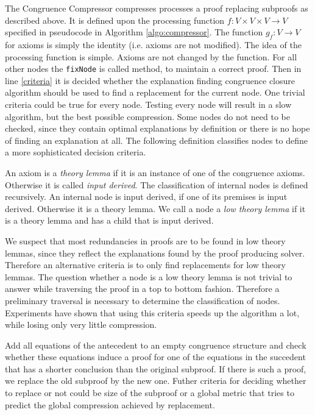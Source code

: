 The Congruence Compressor compresses processes a proof replacing subproofs as described above. 
It is defined upon the processing function $f: V \times V \times V \rightarrow V$ specified in pseudocode in Algorithm \ref{algo:compressor}.
The function $g_f: V \rightarrow V$ for axioms is simply the identity (i.e. axioms are not modified).
The idea of the processing function is simple.
Axioms are not changed by the function.
For all other nodes the \texttt{fixNode} is called method, to maintain a correct proof.
Then in line \ref{criteria} it is decided whether the explanation finding congruence closure algorithm should be used to find a replacement for the current node.
One trivial criteria could be true for every node.
Testing every node will result in a slow algorithm, but the best possible compression.
Some nodes do not need to be checked, since they contain optimal explanations by definition or there is no hope of finding an explanation at all.
The following definition classifies nodes to define a more sophisticated decision criteria.

\begin{definition}

An axiom is a \emph{theory lemma} if it is an instance of one of the congruence axioms.
Otherwise it is called \emph{input derived}.
The classification of internal nodes is defined recursively.
An internal node is input derived, if one of its premises is input derived.
Otherwise it is a theory lemma.
We call a node a \emph{low theory lemma} if it is a theory lemma and has a child that is input derived.

\end{definition}

We suspect that most redundancies in proofs are to be found in low theory lemmas, since they reflect the explanations found by the proof producing solver.
Therefore an alternative criteria is to only find replacements for low theory lemmas.
The question whether a node is a low theory lemma is not trivial to answer while traversing the proof in a top to bottom fashion.
Therefore a preliminary traversal is necessary to determine the classification of nodes.
Experiments have shown that using this criteria speeds up the algorithm a lot, while losing only very little compression.

Add all equations of the antecedent to an empty congruence structure and check whether these equations induce a proof for one of the equations in the succedent that has a shorter conclusion than the original subproof.
If there is such a proof, we replace the old subproof by the new one.
Futher criteria for deciding whether to replace or not could be size of the subproof or a global metric that tries to predict the global compression achieved by replacement.

